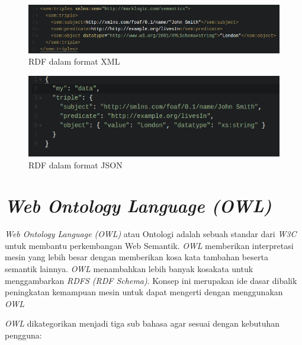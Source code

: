 	\begin{figure}[H]
		\centering
			\includegraphics[scale=0.5]{gambar/rdfinstancexml.png}
			\caption{RDF dalam format XML}
			\label{fig:rdfinstancexml}
	\end{figure}

	\begin{figure}[H]
		\centering
			\includegraphics[scale=0.5]{gambar/rdfinstancejson.png}
			\caption{RDF dalam format JSON}
			\label{fig:rdfinstancejson}
	\end{figure}

\section{\emph{Web Ontology Language (OWL)}}
	\emph{Web Ontology Language (OWL)} atau Ontologi adalah sebuah standar dari \emph{W3C} untuk membantu perkembangan Web Semantik. \emph{OWL} memberikan interpretasi mesin yang lebih besar dengan memberikan kosa kata tambahan beserta semantik lainnya. \emph{OWL} menambahkan lebih banyak kosakata untuk menggambarkan \emph{RDFS (RDF Schema)}. Konsep ini merupakan ide dasar dibalik peningkatan kemampuan mesin untuk dapat mengerti dengan menggunakan \emph{OWL}

	\emph{OWL} dikategorikan menjadi tiga sub bahasa agar sesuai dengan kebutuhan pengguna: 

	\vspace{-0.5cm}


